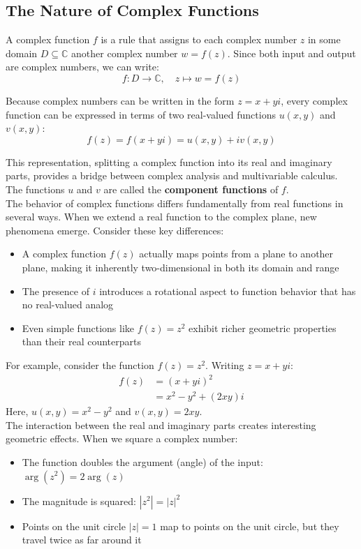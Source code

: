 \subsection*{The Nature of Complex Functions} 

\noindent A complex function $f$ is a rule that assigns to each complex number $z$ in some domain $D \subseteq \mathbb{C}$ another complex number $w = f(z)$. Since both input and output are complex numbers, we can write:
\[
f: D \rightarrow \mathbb{C}, \quad z \mapsto w = f(z)
\]

\noindent Because complex numbers can be written in the form $z = x + yi$, every complex function can be expressed in terms of two real-valued functions $u(x,y)$ and $v(x,y)$:
\[
f(z) = f(x + yi) = u(x,y) + iv(x,y)
\]

\noindent This representation, splitting a complex function into its real and imaginary parts, provides a bridge between complex analysis and multivariable calculus. The functions $u$ and $v$ are called the \textbf{component functions} of $f$. \\

\noindent The behavior of complex functions differs fundamentally from real functions in several ways. When we extend a real function to the complex plane, new phenomena emerge. Consider these key differences:

\begin{itemize}
    \item A complex function $f(z)$ actually maps points from a plane to another plane, making it inherently two-dimensional in both its domain and range
    \item The presence of $i$ introduces a rotational aspect to function behavior that has no real-valued analog
    \item Even simple functions like $f(z) = z^2$ exhibit richer geometric properties than their real counterparts
\end{itemize}

\noindent For example, consider the function $f(z) = z^2$. Writing $z = x + yi$:
\begin{align*}
f(z) &= (x + yi)^2 \\
&= x^2 - y^2 + (2xy)i
\end{align*}
Here, $u(x,y) = x^2 - y^2$ and $v(x,y) = 2xy$. \\

\noindent The interaction between the real and imaginary parts creates interesting geometric effects. When we square a complex number:
\begin{itemize}
    \item The function doubles the argument (angle) of the input: $\arg(z^2) = 2\arg(z)$
    \item The magnitude is squared: $|z^2| = |z|^2$
    \item Points on the unit circle $|z| = 1$ map to points on the unit circle, but they travel twice as far around it
\end{itemize}

